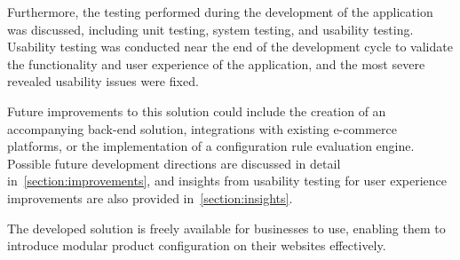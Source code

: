 Furthermore, the testing performed during the development of the application was discussed, including unit testing, system testing, and usability testing. Usability testing was conducted near the end of the development cycle to validate the functionality and user experience of the application, and the most severe revealed usability issues were fixed.

Future improvements to this solution could include the creation of an accompanying back-end solution, integrations with existing e-commerce platforms, or the implementation of a configuration rule evaluation engine. Possible future development directions are discussed in detail in~\autoref{section:improvements}, and insights from usability testing for user experience improvements are also provided in~\autoref{section:insights}.

The developed solution is freely available for businesses to use, enabling them to introduce modular product configuration on their websites effectively.
